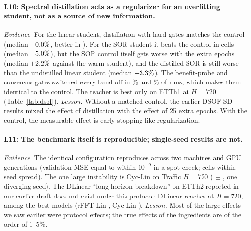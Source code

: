 \documentclass[11pt,a4paper]{article}
\newcommand{\lrn}[1]{\textbf{L#1}}
\begin{document}
\paragraph{\lrn{10}: Spectral distillation acts as a regularizer for an overfitting student, not as a source of new information.}
\emph{Evidence.} For the linear student, distillation with hard gates matches the control (median $-0.0\%$, better in \dsofLINEARhardWins{}). For the SOR student it beats the control in \dsofSORhardWins{} cells (median $-5.0\%$), but the SOR control itself gets worse with the extra epochs (median $+2.2\%$ against the warm student), and the distilled SOR is still worse than the undistilled linear student (median $+3.3\%$). The benefit-probe and consensus gates switched every band off in \benefitAllZeroPct\% and \consensusAllZeroPct\% of runs, which makes them identical to the control. The teacher is best only on ETTh1 at $H{=}720$ (Table~\ref{tab:dsof}).
\emph{Lesson.} Without a matched control, the earlier DSOF-SD results mixed the effect of distillation with the effect of 25 extra epochs. With the control, the measurable effect is early-stopping-like regularization.

\paragraph{\lrn{11}: The benchmark itself is reproducible; single-seed results are not.}
\emph{Evidence.} The identical configuration reproduces across two machines and GPU generations (validation MSE equal to within $10^{-9}$ in a spot check; \xmAgree{} cells within seed spread). The one large instability is Cyc-Lin on Traffic $H{=}720$ (\trafficSevenTwentyCycLin{} $\pm$ \trafficSevenTwentyCycLinStd{}, one diverging seed). The DLinear ``long-horizon breakdown'' on ETTh2 reported in our earlier draft does not exist under this protocol: DLinear reaches \dlinearEtthTwoSevenTwenty{} at $H{=}720$, among the best models (rFFT-Lin \rfftEtthTwoSevenTwenty, Cyc-Lin \cycLinEtthTwoSevenTwenty).
\emph{Lesson.} Most of the large effects we saw earlier were protocol effects; the true effects of the ingredients are of the order of 1--5\%.
\end{document}
